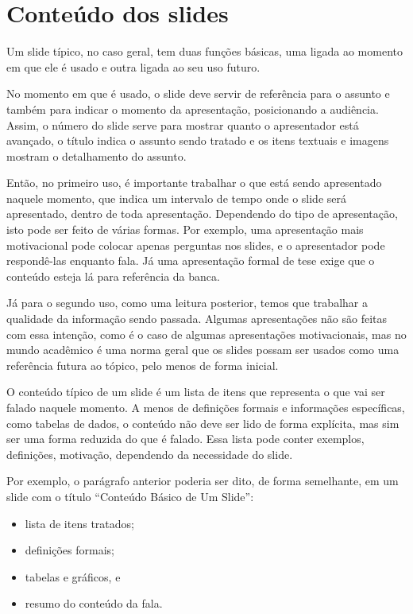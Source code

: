 \section{Conteúdo dos slides}

Um slide típico, no caso geral, tem duas funções básicas, uma ligada ao momento em que ele é usado e outra ligada ao seu uso futuro.

No momento em que é usado, o slide deve servir de referência para o assunto e também para indicar o momento da apresentação, posicionando a audiência. Assim, o número do slide serve para mostrar quanto o apresentador está avançado, o título indica o assunto sendo tratado e os itens textuais e imagens mostram o detalhamento do assunto.



Então, no primeiro uso, é importante trabalhar o que está sendo apresentado naquele momento, que indica um intervalo de tempo onde o slide será apresentado, dentro de toda apresentação. Dependendo do tipo de apresentação, isto pode ser feito de várias formas. Por exemplo, uma apresentação mais motivacional pode colocar apenas perguntas nos slides, e o apresentador pode respondê-las enquanto fala. Já uma apresentação formal de tese exige que o conteúdo esteja lá para referência da banca.

Já para o segundo uso, como uma leitura posterior, temos que trabalhar a qualidade da informação sendo passada. Algumas apresentações não são feitas com essa intenção, como é o caso de algumas apresentações motivacionais, mas no mundo acadêmico é uma norma geral que os slides possam ser usados como uma referência futura ao tópico, pelo menos de forma inicial.

O conteúdo típico de um slide é um lista de itens  que representa o que vai ser falado naquele momento. A menos de definições formais e informações específicas, como tabelas de dados, o conteúdo não deve ser lido de forma explícita, mas sim ser uma forma reduzida do que é falado.  Essa lista pode conter exemplos, definições, motivação, dependendo da necessidade do slide.

Por exemplo, o parágrafo anterior poderia ser dito, de forma semelhante, em um slide com o título ``Conteúdo Básico de Um Slide'':
\begin{itemize}
    \item lista de itens tratados;
    \item definições formais;
    \item tabelas e gráficos, e
    \item resumo do conteúdo da fala.
\end{itemize}

